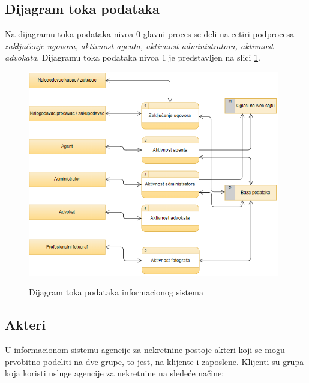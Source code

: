 \documentclass[20pt]{article}
\begin{document}
\newpage
\subsection{\bfseries \Large Dijagram toka podataka}
\setlength{\parindent}{1cm}
\fontsize{13}{18} \selectfont 

Na dijagramu toka podataka nivoa 0 glavni proces se deli na cetiri podprocesa - {\it zaključenje ugovora, aktivnost agenta, aktivnost administratora, aktivnost advokata}.
Dijagramu toka podataka nivoa 1 je predstavljen na slici \ref{fig:dijagramTokaPodatakaIS}. 

\begin{figure}[h]
		\centering
		\includegraphics[width=0.98\textwidth,height=0.5\textheight]{Pictures/DijagramTokaPodataka}\\
		\caption{Dijagram toka podataka informacionog sistema}
		\label{fig:dijagramTokaPodatakaIS}
	\end{figure}

\newpage
\subsection{\bfseries \Large Akteri}
\setlength{\parindent}{1cm}
\fontsize{13}{18} \selectfont 

\indent U informacionom sistemu agencije za nekretnine postoje akteri koji se mogu prvobitno podeliti na dve grupe, to jest, na klijente i zaposlene. Klijenti su grupa koja koristi usluge agencije za nekretnine na slede\' ce na\v {c}ine:\\
\end{document}
